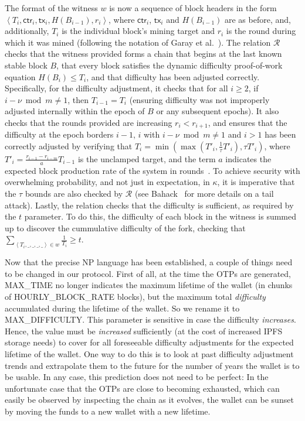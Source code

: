 The format of the witness $w$ is now a sequence
of block headers in the form
$\left<T_i, \textsf{ctr}_i, \textsf{tx}_i, H(B_{i-1}), r_i\right>$,
where $\textsf{ctr}_i$, $\textsf{tx}_i$ and $H(B_{i-1})$ are as before, and,
additionally, $T_i$ is the individual block's mining target and $r_i$ is
the round during which it was mined (following the notation of Garay
et al.~\cite{varbackbone}). The relation $\mathcal{R}$ checks that
the witness provided forms a chain that begins at the last known stable block $B$,
that every block satisfies the dynamic difficulty proof-of-work equation
$H(B_i) \leq T_i$, and that difficulty has been adjusted correctly.
Specifically, for the difficulty adjustment, it checks that
for all $i \geq 2$, if $i - \nu \bmod m \neq 1$, then $T_{i-1} = T_i$
(ensuring difficulty was not improperly adjusted internally within the epoch of $B$ or any
subsequent epochs).
It also checks that the rounds
provided are increasing $r_i < r_{i+1}$, and ensures that the difficulty
at the epoch borders $i-1$, $i$ with $i - \nu \bmod m \neq 1$ and $i > 1$
has been correctly adjusted by verifying that
$T_{i} = \min(\max(T'_i, \frac{1}{\tau} T'_i), \tau T'_i)$,
where $T'_i = \frac{r_{i-1} - r_{i-m}}{a} T_{i-1}$ is the unclamped
target, and the term $a$ indicates the expected block production rate of the system in
rounds~\cite{varbackbone}.
To achieve security with overwhelming probability, and not just in expectation,
in $\kappa$, it is imperative that the $\tau$ bounds are also checked by $\mathcal{R}$
(see Bahack~\cite{bahack} for more details on a tail attack).
Lastly, the relation checks that the difficulty is sufficient, as required
by the $t$ parameter. To do this, the difficulty of each block in the witness
is summed up to discover the cummulative difficulty of the fork, checking that
$\sum_{\left<T_i, \_, \_, \_, \_\right> \in w} \frac{1}{T_i} \geq t$.

Now that the precise \textsc{NP} language has been established, a
couple of things need to be changed in our protocol. First of all, at the time
the OTPs are generated, \textsf{MAX\_TIME} no longer indicates the maximum
lifetime of the wallet (in chunks of \textsf{HOURLY\_BLOCK\_RATE} blocks),
but the maximum total \emph{difficulty} accumulated
during the lifetime of the wallet. So we rename it to \textsf{MAX\_DIFFICULTY}.
This parameter is sensitive in case the difficulty
\emph{increases}. Hence, the value must be \emph{increased} sufficiently
(at the cost of increased IPFS storage needs)
to cover for all foreseeable difficulty adjustments for the expected lifetime
of the wallet. One way to do this is to look at past difficulty adjustment
trends and extrapolate them to the future for the number of years the
wallet is to be usable. In any case, this prediction does not need to be
perfect: In the unfortunate case that the OTPs are close to becoming exhausted,
which can easily be observed by inspecting the chain as it evolves,
the wallet can be sunset by moving the funds to a new wallet with a new
lifetime.

